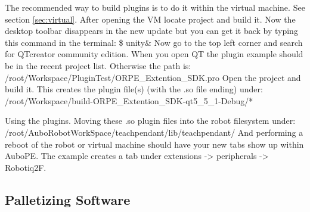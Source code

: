 \documentclass{article}
\begin{document}
The recommended way to build plugins is to do it within the virtual machine. See section \ref{sec:virtual}. 
After opening the VM locate project and build it.
Now the desktop toolbar disappears in the new update but you can get it back by typing this command in the terminal: 
\$ unity\& 
Now go to the top left corner and search for QTcreator community edition. 
When you open QT the plugin example should be in the recent project list. Otherwise the path is: /root/Workspace/PluginTest/ORPE_Extention_SDK.pro
Open the project and build it. 
This creates the plugin file(s) (with  the .so file ending) under: /root/Workspace/build-ORPE_Extention_SDK-qt5_5_1-Debug/*

Using the plugins.
Moving these .so plugin files into the robot filesystem under: /root/AuboRobotWorkSpace/teachpendant/lib/teachpendant/
And performing a reboot of the robot or virtual machine should have your new tabs show up within AuboPE. The example creates a tab under extensions -> peripherals -> Robotiq2F.


\subsection{Palletizing Software}
\end{document}
